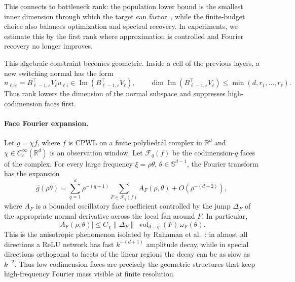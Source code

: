 \documentclass{article}
\newcommand{\R}{\mathbb{R}}
\newcommand{\wh}{\widehat}
\DeclareMathOperator{\im}{Im}
\begin{document}
This connects to bottleneck rank: the population lower bound is the smallest inner dimension through which the target can factor~\cite{jacot2022implicitrank,jacot2023bottleneck}, while the finite-budget choice also balances optimization and spectral recovery. In experiments, we estimate this by the first rank where approximation is controlled and Fourier recovery no longer improves.

This algebraic constraint becomes geometric. Inside a cell of the previous layers, a new switching normal has the form
\begin{equation}
n_{\ell i\varepsilon}=B_{\ell-1,\varepsilon}^{\top}V_\ell u_{\ell i}
\in \im(B_{\ell-1,\varepsilon}^{\top}V_\ell),
\qquad
\dim \im(B_{\ell-1,\varepsilon}^{\top}V_\ell)\le \min(d,r_1,\ldots,r_\ell).
\end{equation}
Thus rank lowers the dimension of the normal subspace and suppresses high-codimension faces first.

\paragraph{Face Fourier expansion.}
Let $g=\chi f$, where $f$ is CPWL on a finite polyhedral complex in $\R^d$ and $\chi\in C_c^\infty(\R^d)$ is an observation window. Let $\mathcal F_q(f)$ be the codimension-$q$ faces of the complex. For every large frequency $\xi=\rho\theta$, $\theta\in\mathbb S^{d-1}$, the Fourier transform has the expansion
\begin{equation}
\wh g(\rho\theta)
=
\sum_{q=1}^d
\rho^{-(q+1)}
\sum_{F\in\mathcal F_q(f)}
A_F(\rho,\theta)
+O(\rho^{-(d+2)}),
\label{eq:face-expansion}
\end{equation}
where $A_F$ is a bounded oscillatory face coefficient controlled by the jump $\Delta_F$ of the appropriate normal derivative across the local fan around $F$. In particular,
\begin{equation}
|A_F(\rho,\theta)|
\le C_\chi \|\Delta_F\|\,\operatorname{vol}_{d-q}(F)\,\omega_F(\theta).
\end{equation}
This is the anisotropic phenomenon isolated by Rahaman et al.~\citep{rahaman2019}: in almost all directions a ReLU network has fast $k^{-(d+1)}$ amplitude decay, while in special directions orthogonal to facets of the linear regions the decay can be as slow as $k^{-2}$. Thus low codimension faces are precisely the geometric structures that keep high-frequency Fourier mass visible at finite resolution.
\end{document}
